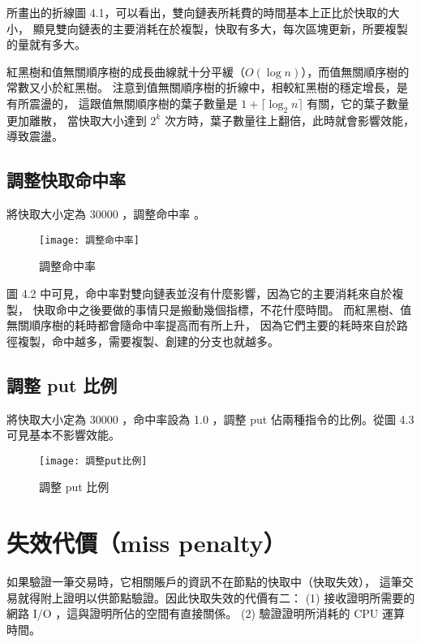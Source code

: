 所畫出的折線圖 4.1，可以看出，雙向鏈表所耗費的時間基本上正比於快取的大小，
顯見雙向鏈表的主要消耗在於複製，快取有多大，每次區塊更新，所要複製的量就有多大。

紅黑樹和值無關順序樹的成長曲線就十分平緩（$O(\log n)$），而值無關順序樹的常數又小於紅黑樹。
注意到值無關順序樹的折線中，相較紅黑樹的穩定增長，是有所震盪的，
這跟值無關順序樹的葉子數量是 $1 + \lceil \log_2 n \rceil$ 有關，它的葉子數量更加離散，
當快取大小達到 $2^k$ 次方時，葉子數量往上翻倍，此時就會影響效能，導致震盪。

\subsection{調整快取命中率}

將快取大小定為 30000 ，調整命中率 。

\begin{figure}[h!]
\texttt{[image: 調整命中率]}
\caption{調整命中率}
\end{figure}

圖 4.2 中可見，命中率對雙向鏈表並沒有什麼影響，因為它的主要消耗來自於複製，
快取命中之後要做的事情只是搬動幾個指標，不花什麼時間。
而紅黑樹、值無關順序樹的耗時都會隨命中率提高而有所上升，
因為它們主要的耗時來自於路徑複製，命中越多，需要複製、創建的分支也就越多。

\subsection{調整 put 比例}

將快取大小定為 30000 ，命中率設為 1.0 ，調整 put 佔兩種指令的比例。從圖 4.3 可見基本不影響效能。

\begin{figure}[h!]
\texttt{[image: 調整put比例]}
\caption{調整 put 比例}
\end{figure}


\section{失效代價（miss penalty）}

如果驗證一筆交易時，它相關賬戶的資訊不在節點的快取中（快取失效），
這筆交易就得附上證明以供節點驗證。因此快取失效的代價有二：
(1) 接收證明所需要的網路 I/O ，這與證明所佔的空間有直接關係。
(2) 驗證證明所消耗的 CPU 運算時間。


